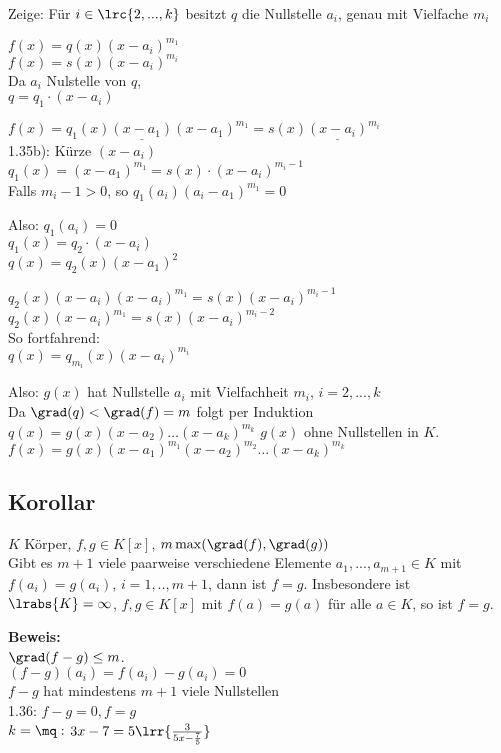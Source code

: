 	Zeige: Für $i\in\lrc{2,...,k}$ besitzt $q$ die Nullstelle $a_i$, genau mit Vielfache $m_i$

	$f(x)=q(x)(x-a_i)^{m_1}$\\
	$f(x)=s(x)(x-a_i)^{m_i}$\\
	Da $a_i$ Nulstelle von $q$,\\
	$q=q_1\cdot(x-a_i)$

	$f(x)=q_1(x)\underline{(x-a_1)}(x-a_1)^{m_1}=s(x)\underline{(x-a_i)}^{m_i}$\\
	1.35b): Kürze $(x-a_i)$\\
	$q_1(x)=(x-a_1)^{m_1}=s(x)\cdot(x-a_i)^{m_i-1}$\\
	Falls $m_i-1>0$, so $q_1(a_i)(a_i-a_1)^{m_1}=0$

	Also: $q_1(a_i)=0$\\
	$q_1(x)=q_2\cdot(x-a_i)$\\
	$q(x)=q_2(x)(x-a_1)^2$

	$q_2(x)(x-a_i)(x-a_i)^{m_1}=s(x)(x-a_i)^{m_i-1}$\\
	$q_2(x)(x-a_i)^{m_1}=s(x)(x-a_i)^{m_i-2}$\\
	So fortfahrend:\\
	$q(x)=q_{m_i}(x)(x-a_i)^{m_i}$

	Also: $g(x)$ hat Nullstelle $a_i$ mit Vielfachheit $m_i$, $i=2,...,k$\\
	Da $\grad(q)<\grad(f)=m$ folgt per Induktion $q(x)=g(x)(x-a_2)\dots(x-a_k)^{m_k}$ $g(x)$ ohne Nullstellen in $K$.\\
	$f(x)=g(x)(x-a_1)^{m_1}(x-a_2)^{m_2}\dots(x-a_k)^{m_k}$

	\subsection{Korollar}

	$K$ Körper, $f,g\in K[x]$, $m\max(\grad(f),\grad(g))$\\
	Gibt es $m+1$ viele paarweise verschiedene Elemente $a_1,...,a_{m+1}\in K$ mit $f(a_i)=g(a_i)$, $i=1,..,m+1$, dann ist $f=g$. Insbesondere ist $\lrabs{K}=\infty$, $f,g\in K[x]$ mit $f(a)=g(a)$ für alle $a\in K$, so ist $f=g$.

	\textbf{Beweis:}\\
	$\grad(f-g)\leq m$.\\
	$(f-g)(a_i)=f(a_i)-g(a_i)=0$\\
	$f-g$ hat mindestens $m+1$ viele Nullstellen\\
	1.36: $f-g=0,f=g$\\
	$k=\mq:$ $3x-7=5\lrr{\frac{3}{5x-\frac{7}{5}}}$

